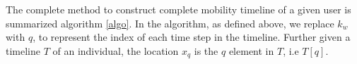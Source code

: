 The complete method to construct complete mobility timeline of a given user is summarized algorithm \ref{algo}. In the algorithm, as defined above, we replace $k_w$ with $q$, to represent the index of each time step in the timeline. Further given a timeline $T$ of an individual, the location $x_q$ is the $q$ element in $T$, i.e $T[q]$. 

